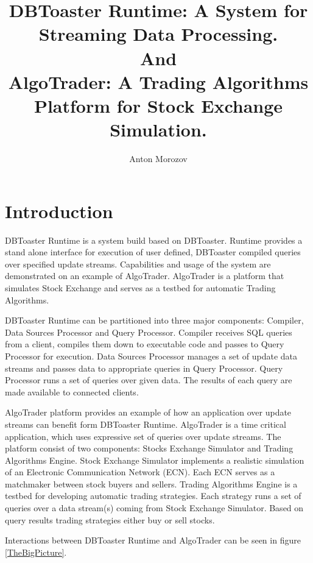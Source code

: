 \documentclass[14pt]{article}
\begin{document}
	
\title{DBToaster Runtime: A System for Streaming Data Processing. \\And\\ AlgoTrader: A Trading Algorithms Platform for Stock Exchange Simulation.}
\author{Anton Morozov}
\maketitle

\section{Introduction}

DBToaster Runtime is a system build based on DBToaster. Runtime provides a stand alone interface for execution of user defined, DBToaster compiled queries over specified update streams. Capabilities and usage of the system are demonstrated on an example of AlgoTrader. AlgoTrader is a platform that simulates Stock Exchange and serves as a testbed for automatic Trading Algorithms.   

DBToaster Runtime can be partitioned into three major components: Compiler, Data Sources Processor and Query Processor. Compiler receives SQL queries from a client, compiles them down to executable code and passes to Query Processor for execution. Data Sources Processor manages a set of update data streams and passes data to appropriate queries in Query Processor. Query Processor runs a set of queries over given data. The results of each query are made available to connected clients. 

AlgoTrader platform provides an example of how an application over update streams can benefit form DBToaster Runtime. AlgoTrader is a time critical application, which uses expressive set of queries over update streams. The platform consist of two components: Stocks Exchange Simulator and Trading Algorithms Engine. Stock Exchange Simulator implements a realistic simulation of an Electronic Communication Network (ECN). Each ECN serves as a matchmaker between stock buyers and sellers. Trading Algorithms Engine is a testbed for developing automatic trading strategies. Each strategy runs a set of queries over a data stream(s) coming from Stock Exchange Simulator. Based on query results trading strategies either buy or sell stocks.

Interactions between DBToaster Runtime and AlgoTrader can be seen in figure \ref{TheBigPicture}.
\end{document}
